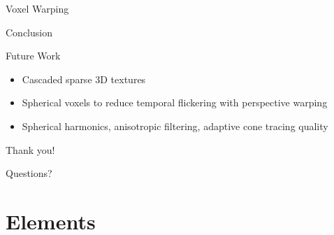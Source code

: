 \documentclass[10pt]{beamer}
\begin{document}
\begin{frame}{Voxel Warping}
\end{frame}

{
\begin{frame}{Conclusion}
\end{frame}}

\begin{frame}{Future Work}


  \begin{itemize}
    \item Cascaded sparse 3D textures %
    \item Spherical voxels to reduce temporal flickering with perspective warping %
    \item Spherical harmonics, anisotropic filtering, adaptive cone tracing quality %
  \end{itemize}
\end{frame}

\begin{frame}{}
  \begin{center}
    \LARGE Thank you!
  \end{center}
\end{frame}

\begin{frame}{}
  \begin{center}
    \LARGE Questions?
  \end{center}
\end{frame}


\section{Elements}
\end{document}
